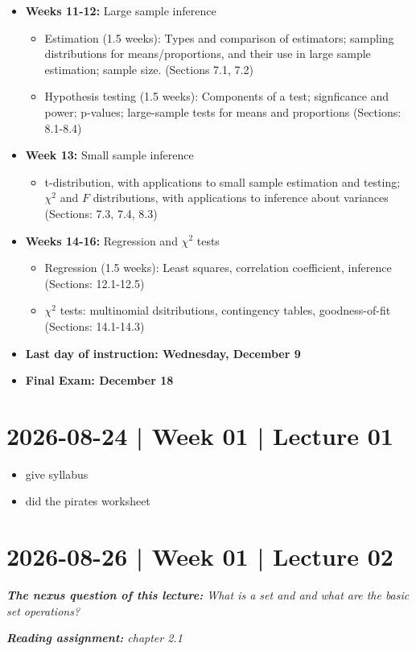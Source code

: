 \documentclass[10pt]{article}
\theoremstyle{definition}
\newcommand{\1}[1]{\textbf{1}_{\left[#1\right]}} %
\begin{document}
\begin{itemize}
  \item \textbf{Weeks 11-12:} Large sample inference
  \begin{itemize}
    \item Estimation (1.5 weeks): Types and comparison of estimators; sampling distributions
    for means/proportions, and their use in large sample estimation; sample size. (Sections 7.1,
    7.2)
    \item Hypothesis testing (1.5 weeks): Components of a test; signficance and power; p-values;
    large-sample tests for means and proportions (Sections: 8.1-8.4)
  \end{itemize}
  \item \textbf{Week 13:} Small sample inference
  \begin{itemize}
    \item t-distribution, with applications to small sample estimation and testing; $\chi^{2}$ and $F$
    distributions, with applications to inference about variances (Sections: 7.3, 7.4, 8.3)
  \end{itemize}
  \item \textbf{Weeks 14-16:} Regression and $\chi^{2}$ tests
  \begin{itemize}
    \item Regression (1.5 weeks): Least squares, correlation coefficient, inference (Sections:
    12.1-12.5)
    \item $\chi^{2}$ tests: multinomial dsitributions, contingency tables, goodness-of-fit (Sections: 14.1-14.3)
  \end{itemize}
  \item \textbf{Last day of instruction: Wednesday, December 9}
  \item \textbf{Final Exam: December 18}
\end{itemize} 
\newpage
\section{2026-08-24 | Week 01 |  Lecture 01}
\begin{itemize}
  \item give syllabus
  \item did the pirates worksheet
\end{itemize}

\newpage
\section{2026-08-26  | Week 01 | Lecture 02}
\begin{center}
  \begin{tcolorbox}[width=0.9\textwidth, colback=white, colframe=black]
    \textit{\textbf{The nexus question of this lecture:} What is a set and and
      what are the basic set operations?}

    \textit{\textbf{Reading assignment:} chapter 2.1}
  \end{tcolorbox}
\end{center}
\end{document}
